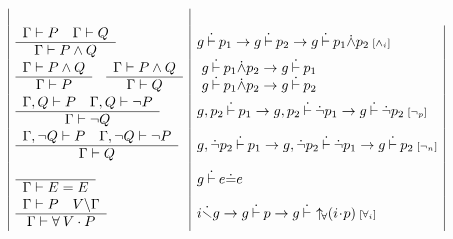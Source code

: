 \documentclass{llncs}
\begin{document}
\begin{table}
\[\begin{array}{|l|l|}
\\

\begin{array}{c}
\Gamma \vdash P \quad \Gamma \vdash Q \\\hline \Gamma \vdash P \land Q
\end{array}
&
g\Binf p_1 \to g\Binf p_2 \to g\Binf p_1 \pand p_2 \rulename{\land_i}

\\

\begin{array}{c}
\Gamma \vdash P \land Q \\\hline \Gamma \vdash P
\end{array}
\quad
\begin{array}{c}
\Gamma \vdash P \land Q \\\hline \Gamma \vdash Q
\end{array}
&
\begin{array}{l}
\!g\Binf p_1 \pand p_2 \to g\Binf p_1\\
\!g\Binf p_1 \pand p_2 \to g\Binf p_2
\end{array}

\\

\begin{array}{c}
\Gamma,Q \vdash P \quad \Gamma,Q \vdash \lnot P \\\hline \Gamma \vdash \lnot Q
\end{array}
&
g,p_2\Binf p_1\to g,p_2\Binf\pnot p_1\to g\Binf\pnot p_2 \rulename{\lnot_p}

\\

\begin{array}{c}
\Gamma,\lnot Q \vdash P \quad \Gamma,\lnot Q \vdash \lnot P \\\hline \Gamma \vdash Q
\end{array}
&
g,\pnot p_2\Binf p_1\to g,\pnot p_2\Binf\pnot p_1\to g\Binf p_2 \rulename{\lnot_n}

\\

\begin{array}{c}
\\\hline \Gamma \vdash E=E
\end{array}
&
g \Binf e \pequ e

\\

\begin{array}{c}
\Gamma \vdash P \quad V \backslash \Gamma \\\hline
\Gamma \vdash \forall\: V \cdot P
\end{array}
&
i \Bnotfree g \to g \Binf p \to g \Binf \Bbdfor{i}{p} \rulename{\forall_i}


\end{array}\]
\end{table}
\end{document}
